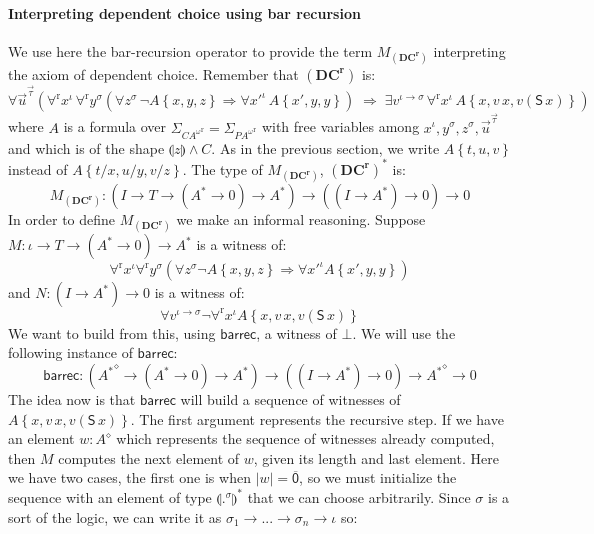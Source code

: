 \documentclass{CSML}
\renewcommand{\ldots}{...}
\newcommand*\SortBase\iota
\newcommand*\SortTo\to
\newcommand*\SortA{\sigma}
\newcommand*\SortB{\tau}
\newcommand*\LogSortedTerm[2]{#1^{#2}}
\newcommand*\LogTermA{t}
\newcommand*\LogTermB{u}
\newcommand*\LogTermC{v}
\newcommand*\LogVarA{x}
\newcommand*\LogVarB{y}
\newcommand*\LogVarC{z}
\newcommand*\LogVarD{u}
\newcommand*\LogVarE{v}
\newcommand*\LogConst[1]{\mathsf{#1}}
\newcommand*\LogImp{\mathbin{\Rightarrow}}
\newcommand*\LogAnd{\mathbin{\wedge}}
\newcommand*\LogBot\bot
\newcommand*\LogRel[1]{\llparenthesis#1\rrparenthesis}
\newcommand*\LogRelForm[1]{{#1^\mathrm{r}}}
\newcommand*\LogForallRel{\forall^\mathrm{r}}
\newcommand*\LogFormA{A}
\newcommand*\LogFormC{C}
\newcommand*\LogSubst[1]{\left\{#1\right\}}
\newcommand*\LmSortBot0
\newcommand*\LmSortTo\to
\newcommand*\LmSortA{T}
\newcommand*\LmTerm[2]{#1\mathrel{:}#2}
\newcommand*\LmTermA{M}
\newcommand*\LmTermB{N}
\newcommand*\LmVarF{w}
\newcommand*\LmConst[1]{\mathsf{#1}}
\newcommand*\LmInterpForm[1]{{#1}^*}
\newcommand*\LmInterpAxiom[1]{M_{#1}}
\newcommand*\PA{{P\!A}}
\newcommand*\PAom{{\PA^\omega}}
\newcommand*\CA{{C\!A}}
\newcommand*\CAom{{\CA^\omega}}
\newcommand*\CASort\iota
\newcommand*\CASortList[1]{{#1}^\diamond}
\newcommand*\CALogS{\LogConst{S}}
\newcommand*\CAAxName[1]{{\bm{\scriptstyle(#1)}}}
\newcommand*\CADCName{\CAAxName{DC^r}}
\newcommand*\CADC[3]{\forall\LogSortedTerm{\vec{\LogVarD}}{\vec{#3}}\left(\LogForallRel\LogSortedTerm{\LogVarA}{\CASort}\,\LogForallRel\LogSortedTerm{\LogVarB}{#1}\left(\forall\LogSortedTerm{\LogVarC}{#1}\,\neg#2\LogSubst{\LogVarA,\LogVarB,\LogVarC}\LogImp\forall\LogSortedTerm{\LogVarA'}{\CASort}\,#2\LogSubst{\LogVarA',\LogVarB,\LogVarB}\right)\;\LogImp\;\exists\LogSortedTerm{\LogVarE}{\CASort\SortTo#1}\,\LogForallRel\LogSortedTerm{\LogVarA}{\CASort}\,#2\LogSubst{\LogVarA,\LogVarE\,\LogVarA,\LogVarE\left(\CALogS\,\LogVarA\right)}\right)}
\newcommand*\CALmn[1]{\LmConst{\overline{#1}}}
\newcommand*\CALmnSort{I}
\newcommand*\CALmbarrec{\LmConst{barrec}}
\newcommand*\CALmbarrecSort[2]{\left(\CASortList{#1}\LmSortTo\left(#1\LmSortTo#2\right)\LmSortTo#1\right)\LmSortTo\left(\left(\CALmnSort\LmSortTo#1\right)\LmSortTo#2\right)\LmSortTo\CASortList{#1}\LmSortTo#2}
\newcommand*\CALmlen[1]{\left|#1\right|}
\begin{document}
\paragraph{Interpreting dependent choice using bar recursion}
We use here the bar-recursion operator to provide the term $\LmInterpAxiom{\CADCName}$ interpreting the axiom of dependent choice. Remember that $\CADCName$ is:
$$\CADC{\SortA}{\LogFormA}{\SortB}$$
where $\LogFormA$ is a formula over $\Sigma_\LogRelForm{\CAom}=\Sigma_\LogRelForm{\PAom}$ with free variables among $\LogSortedTerm{\LogVarA}{\CASort},\LogSortedTerm{\LogVarB}{\SortA},\LogSortedTerm{\LogVarC}{\SortA},\LogSortedTerm{\vec{\LogVarD}}{\vec{\SortB}}$ and which is of the shape $\LogRel{\LogVarC}\LogAnd\LogFormC$. As in the previous section, we write $\LogFormA\LogSubst{\LogTermA,\LogTermB,\LogTermC}$ instead of $\LogFormA\LogSubst{\LogTermA/\LogVarA,\LogTermB/\LogVarB,\LogTermC/\LogVarC}$. The type of $\LmInterpAxiom{\CADCName}$, $\LmInterpForm{\CADCName}$ is:
$$\LmTerm{\LmInterpAxiom{\CADCName}}{\left(\CALmnSort\LmSortTo\LmSortA\LmSortTo\left(\LmInterpForm{\LogFormA}\LmSortTo\LmSortBot\right)\LmSortTo\LmInterpForm{\LogFormA}\right)\LmSortTo\left(\left(\CALmnSort\LmSortTo\LmInterpForm{\LogFormA}\right)\LmSortTo\LmSortBot\right)\LmSortTo\LmSortBot}$$
In order to define $\LmInterpAxiom{\CADCName}$ we make an informal reasoning. Suppose $\LmTerm{\LmTermA}{\CASort\LmSortTo\LmSortA\LmSortTo\left(\LmInterpForm{\LogFormA}\LmSortTo\LmSortBot\right)\LmSortTo\LmInterpForm{\LogFormA}}$ is a witness of:
$$\LogForallRel\LogSortedTerm{\LogVarA}{\CASort}\LogForallRel\LogSortedTerm{\LogVarB}{\SortA}\left(\forall\LogSortedTerm{z}{\SortA}\neg\LogFormA\LogSubst{\LogVarA,\LogVarB,\LogVarC}\LogImp\forall\LogSortedTerm{\LogVarA'}{\CASort}\LogFormA\LogSubst{\LogVarA',\LogVarB,\LogVarB}\right)$$
and $\LmTerm{\LmTermB}{\left(\CALmnSort\LmSortTo\LmInterpForm{\LogFormA}\right)\LmSortTo\LmSortBot}$ is a witness of:
$$\forall\LogSortedTerm{\LogVarE}{\CASort\to\SortA}\neg\LogForallRel\LogSortedTerm{\LogVarA}{\CASort}\LogFormA\LogSubst{\LogVarA,\LogVarE\,\LogVarA,\LogVarE\left(\CALogS\,\LogVarA\right)}$$
We want to build from this, using $\CALmbarrec$, a witness of $\LogBot$. We will use the following instance of $\CALmbarrec$:
$$\LmTerm{\CALmbarrec}{\CALmbarrecSort{\LmInterpForm{\LogFormA}}{\LmSortBot}}$$
The idea now is that $\CALmbarrec$ will build a sequence of witnesses of $\LogFormA\LogSubst{\LogVarA,\LogVarE\,\LogVarA,\LogVarE\left(\CALogS\,\LogVarA\right)}$. The first argument represents the recursive step. If we have an element $\LmTerm{\LmVarF}{\CASortList{\LogFormA}}$ which represents the sequence of witnesses already computed, then $\LmTermA$ computes the next element of $\LmVarF$, given its length and last element. Here we have two cases, the first one is when $\CALmlen{\LmVarF}=\CALmn{0}$, so we must initialize the sequence with an element of type $\LmInterpForm{\LogRel{\LogSortedTerm{.}{\SortA}}}$ that we can choose arbitrarily. Since $\SortA$ is a sort of the logic, we can write it as $\SortA_1\SortTo\ldots\SortTo\SortA_n\SortTo\SortBase$ so:
\end{document}
